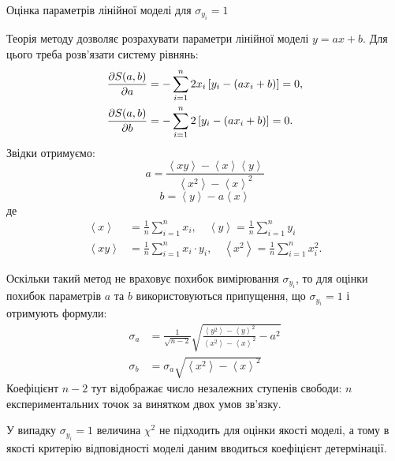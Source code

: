 \documentclass{LabBook}
\begin{document}
\begin{More}{Оцінка параметрів лінійної моделі для $\sigma_{y_i} = 1$}

	Теорія методу дозволяє розрахувати параметри лінійної моделі $y = a x + b$. Для цього треба розв'язати систему рівнянь:
	\begin{align*}\label{}
		\frac{\partial S(a, b)}{\partial a} & = -\sum\limits_{i = 1}^n 2x_i\left[ y_i - (a x_i + b) \right] = 0, \\
		\frac{\partial S(a, b)}{\partial b} & = -\sum\limits_{i = 1}^n 2\left[ y_i - (a x_i + b) \right] = 0.    \\
	\end{align*}
	Звідки отримуємо:
	\begin{equation}\label{MLSa}
		a = \frac{{\left\langle xy \right\rangle  - \left\langle x \right\rangle \left\langle y \right\rangle }}{{\left\langle x^2 \right\rangle  -\left\langle x \right\rangle^2}}
	\end{equation}
	\begin{equation}\label{MLSb}
		b = \left\langle y \right\rangle  - a\left\langle x \right\rangle
	\end{equation}
	де
	\begin{align*}
		\left\langle x \right\rangle  & = \frac{1}{n}\sum\limits_{i = 1}^n x_i, \quad \left\langle y \right\rangle = \frac{1}{n}\sum\limits_{i = 1}^n y_i               \\
		\left\langle xy \right\rangle & = \frac{1}{n}\sum\limits_{i = 1}^n x_i\cdot y_i, \quad \left\langle x^2 \right\rangle = \frac{1}{n}\sum\limits_{i = 1}^n x^2_i.
	\end{align*}

	Оскільки такий метод не враховує похибок вимірювання $\sigma_{y_i}$, то для оцінки похибок параметрів $a$ та $b$ використовуються припущення, що $\sigma_{y_i} = 1$  і отримують формули:
	\begin{align}
		\sigma_a & = \frac{1}{\sqrt{n - 2}}\sqrt{\frac{\left\langle y^2 \right\rangle  -\left\langle y \right\rangle^2}{\left\langle x^2 \right\rangle  -\left\langle x \right\rangle^2} - a^2} \\
		\sigma_b & = \sigma_a \sqrt{\left\langle x^2 \right\rangle  -\left\langle x \right\rangle^2}
	\end{align}
	Коефіцієнт $n - 2$ тут відображає число незалежних ступенів свободи: $n$ експериментальних точок за винятком двох умов  зв'язку.
\end{More}

У випадку $\sigma_{y_i} = 1$ величина $\chi^2$ не підходить для оцінки якості моделі, а тому в якості критерію відповідності моделі даним вводиться коефіцієнт детермінації.
\end{document}
